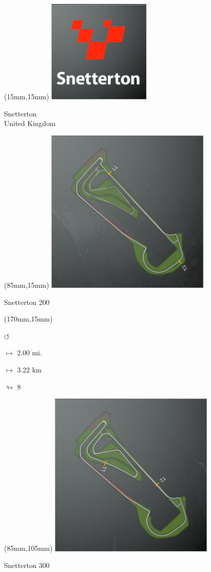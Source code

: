 \begin{textblock*}{60mm}(15mm,15mm)%
\includegraphics[width=50mm]{LG/2015-05-20_00095.png}
\par Snetterton\\ United Kingdom
\end{textblock*}
\begin{textblock*}{80mm}(85mm,15mm)%
\includegraphics[width=80mm]{TR/2015-05-20_00061.png}
\centerline{Snetterton 200}
\end{textblock*}
\begin{textblock*}{30mm}(170mm,15mm)%
\par \Huge$\circlearrowleft$
\Large
\par$\mapsto$ 2.00 mi.
\par$\mapsto$ 3.22 km
\par$\looparrowright$ 8
\end{textblock*}
\begin{textblock*}{80mm}(85mm,105mm)%
\includegraphics[width=80mm]{TR/2015-05-20_00060.png}
\centerline{Snetterton 300}
\end{textblock*}
